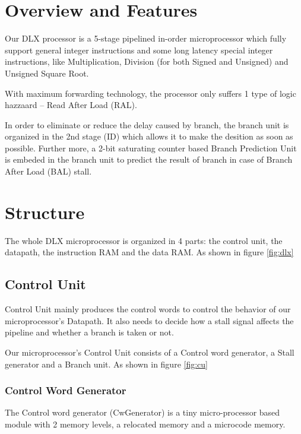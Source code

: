 

\chapter[Overview and Features]{Overview and Features}
Our DLX processor is a 5-stage pipelined in-order microprocessor which fully support
general integer instructions and some long latency special integer instructions,
like Multiplication, Division (for both Signed and Unsigned) and Unsigned Square Root.

With maximum forwarding technology, the processor only suffers 1 type of logic hazzaard -- 
Read After Load (RAL).

In order to eliminate or reduce the delay caused by branch, the branch unit is organized
in the 2nd stage (ID) which allows it to make the desition as soon as possible.
Further more, a 2-bit saturating counter based Branch Prediction Unit is embeded in the branch unit to
predict the result of branch in case of Branch After Load (BAL) stall.

\chapter[Structure]{Structure}
The whole DLX microprocessor is organized in 4 parts: the control unit, the datapath,
the instruction RAM and the data RAM. As shown in figure \ref{fig:dlx}
\section[Control Unit]{Control Unit}
Control Unit mainly produces the control words to control the behavior of our microprocessor's Datapath.
It also needs to decide how a stall signal affects the pipeline and whether a branch
is taken or not.

Our microprocessor's Control Unit consists of a Control word generator, a Stall generator and a Branch unit.
As shown in figure \ref{fig:cu}

\subsection[Control Word Generator]{Control Word Generator}
The Control word generator (CwGenerator) is a tiny micro-processor based module with 2 memory levels,
a relocated memory and a microcode memory.


